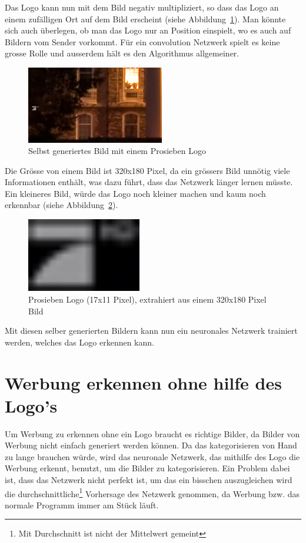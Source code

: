 \documentclass[12pt,a4paper]{report}
\begin{document}
Das Logo kann nun mit dem Bild negativ multipliziert, so dass das Logo an einem zufälligen Ort auf dem Bild erscheint (siehe Abbildung~\ref{fig:logo8}).
Man könnte sich auch überlegen, ob man das Logo nur an Position einspielt, wo es auch auf Bildern vom Sender vorkommt.
Für ein convolution Netzwerk spielt es keine grosse Rolle und ausserdem hält es den Algorithmus allgemeiner.
\begin{figure}[h]%
    \centering
    \includegraphics[width=6cm]{assets/images/logo_on_random_image.png}%
    \caption{Selbst generiertes Bild mit einem Prosieben Logo}%
    \label{fig:logo8}%
\end{figure}
Die Grösse von einem Bild ist 320x180 Pixel, da ein grössers Bild unnötig viele Informationen enthält,
was dazu führt, dass das Netzwerk länger lernen müsste.
Ein kleineres Bild, würde das Logo noch kleiner machen und kaum noch erkennbar (siehe Abbildung~\ref{fig:logo6}).
\begin{figure}[h]%
    \centering
    \includegraphics[width=5cm]{assets/images/logo17x11.png}%
    \caption{Prosieben Logo (17x11 Pixel), extrahiert aus einem 320x180 Pixel Bild}%
    \label{fig:logo6}%
\end{figure}

Mit diesen selber generierten Bildern kann nun ein neuronales Netzwerk trainiert werden, welches das Logo erkennen kann.
\section{Werbung erkennen ohne hilfe des Logo's}
Um Werbung zu erkennen ohne ein Logo braucht es richtige Bilder, da Bilder von Werbung nicht einfach generiert werden können.
Da das kategorisieren von Hand zu lange brauchen würde, wird das neuronale Netzwerk, das mithilfe des Logo die Werbung erkennt, benutzt,
um die Bilder zu kategorisieren.
Ein Problem dabei ist, dass das Netzwerk nicht perfekt ist,
um das ein bisschen auszugleichen wird die durchschnittliche\footnote{Mit Durchschnitt ist nicht der Mittelwert gemeint} Vorhersage des Netzwerk genommen,
da Werbung bzw. das normale Programm immer am Stück läuft.
\end{document}
